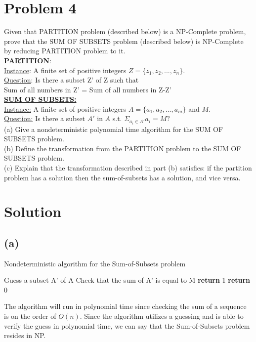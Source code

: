 
\section*{Problem 4}
	Given that PARTITION problem (described below) is a NP-Complete problem, prove that the SUM OF SUBSETS problem (described below) is NP-Complete by reducing PARTITION problem to it.\\
	
	\noindent
	\underline{\textbf{PARTITION}}:\\
	\underline{Instance}: A finite set of positive integers $Z = \{ z_1 , z_2 , ... , z_n \}$.\\
	\underline{Question}: Is there a subset Z' of Z such that \\
	Sum of all numbers in Z' = Sum of all numbers in Z-Z'\\
	
	\noindent
	\underline{\textbf{SUM OF SUBSETS:}}\\
	\underline{Instance:} A finite set of positive integers $A = \{a_1, a_2, \dots, a_m\}$ and $M$.\\
	\underline{Question:} Is there a subset $A'$ in $A$ s.t. $\Sigma_{a_i \in A'} a_i = M?$ \\
	
	\noindent
	(a) Give a nondeterministic polynomial time algorithm for the SUM OF SUBSETS problem.\\
	(b) Define the transformation from the PARTITION problem to the SUM OF SUBSETS problem.\\
	(c) Explain that the transformation described in part (b) satisfies: if the partition problem has a solution then the sum-of-subsets has a solution, and vice versa.
\section*{Solution}
	\subsection*{(a)}
		\begin{algorithm}[H]
			\caption{Nondeterministic algorithm for the Sum-of-Subsets problem}
			\begin{algorithmic}[1]
				\State Guess a subset A' of A
				\State Check that the sum of A' is equal to M
				\State \textbf{return} 1
				\Else 
				\State \textbf{return} 0
				\EndIf
			\end{algorithmic}
		\end{algorithm}
	The algorithm will run in polynomial time since checking the sum of a sequence is on the order of $O(n)$. Since the algorithm utilizes a guessing and is able to verify the guess in polynomial time, we can say that the Sum-of-Subsets problem resides in NP. 
